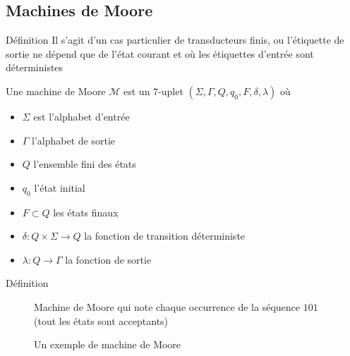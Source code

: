 \documentclass{beamer}
\begin{document}
\subsection{Machines de Moore}

\begin{frame}{Définition}
    Il s'agit d'un cas particulier de transducteurs finis, ou l'étiquette de sortie ne dépend que de l'état
    courant et où les étiquettes d'entrée sont déterministes
    \begin{definition}
        Une machine de Moore $\mathcal{M}$ est un $7$-uplet $(\Sigma, \Gamma, Q, q_0, F, \delta, \lambda)$ où
        \begin{itemize}
            \item $\Sigma$ est l'alphabet d'entrée
            \item $\Gamma$ l'alphabet de sortie
            \item $Q$ l'ensemble fini des états
            \item $q_0$ l'état initial
            \item $F \subset Q$ les états finaux
            \item $\delta : Q \times \Sigma \rightarrow Q$ la fonction de transition déterministe
            \item $\lambda : Q \rightarrow \Gamma$ la fonction de sortie
        \end{itemize}
    \end{definition}
\end{frame}

\begin{frame}{Définition}
    
\begin{figure}[h]
    \caption{Un exemple de machine de Moore}
        \begin{center}
        Machine de Moore qui note chaque occurrence de la séquence $101$ (tout les états sont acceptants)\\
    \end{center}
\end{figure}
\end{frame}
\end{document}
